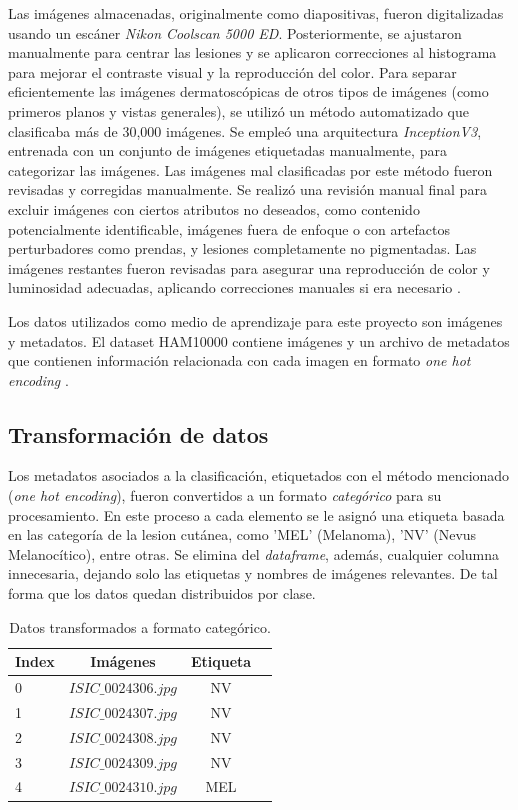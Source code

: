 Las imágenes almacenadas, originalmente como diapositivas, fueron digitalizadas usando un escáner \textit{Nikon Coolscan 5000 ED}. Posteriormente, se ajustaron manualmente para centrar las lesiones y se aplicaron correcciones al histograma para mejorar el contraste visual y la reproducción del color. Para separar eficientemente las imágenes dermatoscópicas de otros tipos de imágenes (como primeros planos y vistas generales), se utilizó un método automatizado que clasificaba más de 30,000 imágenes. Se empleó una arquitectura \textit{InceptionV3}, entrenada con un conjunto de imágenes etiquetadas manualmente, para categorizar las imágenes. Las imágenes mal clasificadas por este método fueron revisadas y corregidas manualmente.  Se realizó una revisión manual final para excluir imágenes con ciertos atributos no deseados, como contenido potencialmente identificable, imágenes fuera de enfoque o con artefactos perturbadores como prendas, y lesiones completamente no pigmentadas. Las imágenes restantes fueron revisadas para asegurar una reproducción de color y luminosidad adecuadas, aplicando correcciones manuales si era necesario . 


Los datos utilizados como medio de aprendizaje para este proyecto son imágenes y metadatos. El dataset HAM10000 contiene imágenes y un archivo de metadatos que contienen información relacionada con cada imagen en formato \textit{one hot encoding} .

\subsection{Transformación de datos}

Los metadatos asociados a la clasificación, etiquetados con el método mencionado (\textit{one hot encoding}), fueron convertidos a un formato \textit{categórico}  para su procesamiento. En este proceso a cada elemento se le asignó una etiqueta basada en las categoría de la lesion cutánea, como 'MEL' (Melanoma), 'NV' (Nevus Melanocítico), entre otras. Se elimina del \textit{dataframe}, además, cualquier columna innecesaria, dejando solo las etiquetas y nombres de imágenes relevantes. De tal forma que los datos quedan distribuidos por clase.

\begin{table}[H]
   \centering
   \begin{tabular}{lccc}
   \hline
   \textbf{Index} & \textbf{Imágenes} & \textbf{Etiqueta} \\
   \hline
      0 & $ISIC\_0024306.jpg$ & NV \\
      1 & $ISIC\_0024307.jpg$ & NV \\
      2 & $ISIC\_0024308.jpg$ & NV \\
      3 & $ISIC\_0024309.jpg$ & NV \\
      4 & $ISIC\_0024310.jpg$ & MEL \\
   \hline
   \end{tabular}
   \caption{Datos transformados a formato categórico.}
   \label{}
\end{table}   

